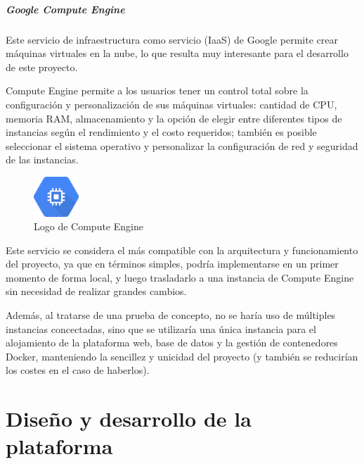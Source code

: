                 \paragraph{Google Compute Engine}

                    Este servicio de infraestructura como servicio (IaaS) de Google permite crear máquinas virtuales en la nube, lo que resulta muy interesante para el desarrollo de este proyecto.

                    Compute Engine permite a los usuarios tener un control total sobre la configuración y personalización de sus máquinas virtuales: cantidad de CPU, memoria RAM, almacenamiento y la opción de elegir entre diferentes tipos de instancias según el rendimiento y el costo requeridos; también es posible seleccionar el sistema operativo y personalizar la configuración de red y seguridad de las instancias.

                    \begin{figure}[htbp]
                        \centering

                        \includegraphics[width=0.15\textwidth]{images/Logos/gce.png}
                        \caption{Logo de Compute Engine}
                        
                        \label{fig:gce-logo}
                    \end{figure}

                    Este servicio se considera el más compatible con la arquitectura y funcionamiento del proyecto, ya que en términos simples, podría implementarse en un primer momento de forma local, y luego trasladarlo a una instancia de Compute Engine sin necesidad de realizar grandes cambios.

                    Además, al tratarse de una prueba de concepto, no se haría uso de múltiples instancias concectadas, sino que se utilizaría una única instancia para el alojamiento de la plataforma web, base de datos y la gestión de contenedores Docker, manteniendo la sencillez y unicidad del proyecto (y también se reducirían los costes en el caso de haberlos).

                    \cleardoublepage



\chapter{Diseño y desarrollo de la plataforma}
    
